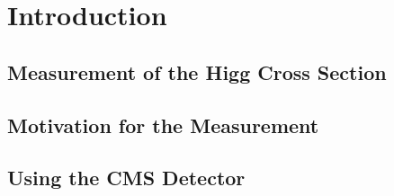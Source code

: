 \chapter{Introduction}

\cite{obs-18}

\section{Measurement of the Higg Cross Section} \label{ch1:what:sec}

 

\section{Motivation for the Measurement} \label{ch1:why:sec}



\section{Using the CMS Detector} \label{ch1:how:sec}


